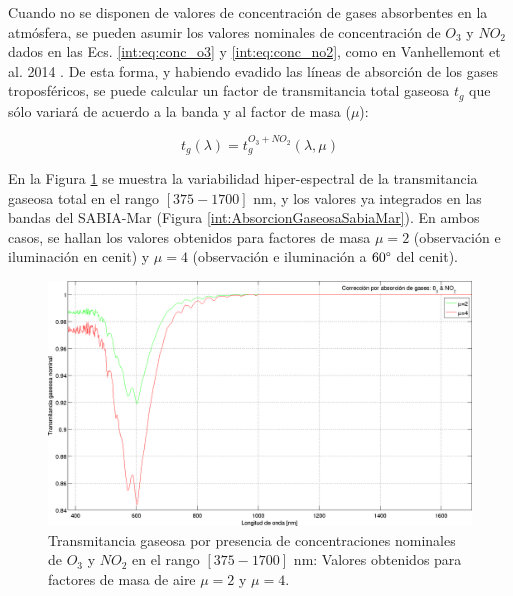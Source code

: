     Cuando no se disponen de valores de concentración de gases absorbentes en la atmósfera, se pueden asumir los valores nominales de concentración de $O_{3}$ y $NO_{2}$ dados en las Ecs. \ref{int:eq:conc_o3} y \ref{int:eq:conc_no2}, como en Vanhellemont et al. 2014 \cite{vanhellemont2014}. De esta forma, y habiendo evadido las líneas de absorción de los gases troposféricos, se puede calcular un factor de transmitancia total gaseosa $t_{g}$ que sólo variará de acuerdo a la banda y al factor de masa ($\mu$):


    \begin{equation}
        t_{g}(\lambda) = t_{g}^{O_{3} + NO_{2}}(\lambda,\mu)
        \label{int:eq:tAbsO3NO2Nominal}
    \end{equation}

    En la Figura \ref{int:AbsorcionGaseosaHyper375_1700} se muestra la variabilidad hiper-espectral de la transmitancia gaseosa total en el rango $[375-1700]$ nm, y los valores ya integrados en las bandas del SABIA-Mar (Figura \ref{int:AbsorcionGaseosaSabiaMar}). En ambos casos, se hallan los valores obtenidos para factores de masa $\mu=2$ (observación e iluminación en cenit) y $\mu=4$ (observación e iluminación a $60\degree$ del cenit). 

    \begin{figure}
    \centering
    \includegraphics[width=\textwidth]{int/figures/AbsorcionGaseosaHyper375_1700.png}
    \caption[Transmitancia gaseosa por presencia de concentraciones nominales de ozono y dióxido de nitrógeno.]{Transmitancia gaseosa por presencia de concentraciones nominales de $O_{3}$ y $NO_{2}$ en el rango $[375-1700]$ nm: Valores obtenidos para factores de masa de aire $\mu = 2$ y $\mu = 4$.}
    \label{int:AbsorcionGaseosaHyper375_1700}
    \end{figure}

